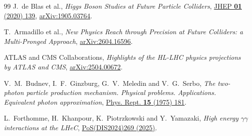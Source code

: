 \begin{thebibliography}{99}
J.~de Blas et al., \emph{Higgs Boson Studies at Future Particle Colliders},
\href{https://doi.org/10.1007/JHEP01(2020)139}{JHEP \textbf{01} (2020) 139},
\href{https://arxiv.org/abs/1905.03764}{arXiv:1905.03764}.




T.~Armadillo et al., \emph{New Physics Reach through Precision at Future Colliders: a Multi-Pronged Approach},
\href{https://arxiv.org/abs/2604.16596}{arXiv:2604.16596}.



ATLAS and CMS Collaborations, \emph{Highlights of the HL-LHC physics projections by ATLAS and CMS},
\href{https://arxiv.org/abs/2504.00672}{arXiv:2504.00672}.



V.~M.~Budnev, I.~F.~Ginzburg, G.~V.~Meledin and V.~G.~Serbo,
\emph{The two-photon particle production mechanism. Physical problems. Applications. Equivalent photon approximation},
\href{https://doi.org/10.1016/0370-1573(75)90009-5}{Phys. Rept. \textbf{15} (1975) 181}.



L.~Forthomme, H.~Khanpour, K.~Piotrzkowski and Y.~Yamazaki,
\emph{High energy $\gamma\gamma$ interactions at the LHeC},
\href{https://doi.org/10.22323/1.469.0269}{PoS(DIS2024)269 (2025)}.


\end{thebibliography}

